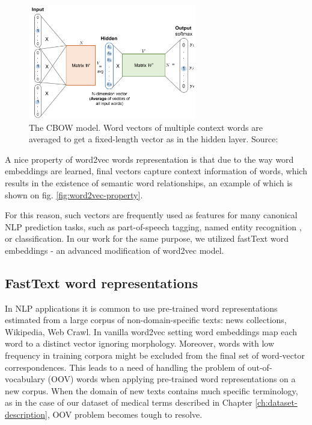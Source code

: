 \begin{figure}[h]
    \centering
    \includegraphics[height=5cm]{Images/word2vec-cbow.png}
    \caption{The CBOW model. Word vectors of multiple context words are averaged to get a fixed-length vector as in the hidden layer. Source: \citep{Weng-2017}}
    \label{fig:word2vec-cbow}
\end{figure} 

A nice property of word2vec words representation is that due to the way word embeddings are learned, final vectors capture context information of words, which results in the existence of semantic word relationships, an example of which is shown on fig. \ref{fig:word2vec-property}. 

For this reason, such vectors are frequently used as features for many canonical NLP prediction tasks, such as part-of-speech tagging, named entity recognition \citep{Collobert:DBLP}, or classification. In our work for the same purpose, we utilized fastText word embeddings - an advanced modification of word2vec model.

\subsection{FastText word representations}
\label{sec:fasttext}

In NLP applications it is common to use pre-trained word representations estimated from a large corpus of non-domain-specific texts: news collections, Wikipedia, Web Crawl. In vanilla word2vec setting word embeddings map each word to a distinct vector ignoring morphology. Moreover, words with low frequency in training corpora might be excluded from the final set of word-vector correspondences. This leads to a need of handling the problem of out-of-vocabulary (OOV) words when applying pre-trained word representations on a new corpus. When the domain of new texts contains much specific terminology, as in the case of our dataset of medical terms described in Chapter \ref{ch:dataset-description}, OOV problem becomes tough to resolve.

